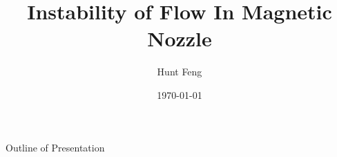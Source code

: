 \documentclass{beamer}
\title{Instability of Flow In Magnetic Nozzle}
\author{Hunt Feng}
\institute{University of Saskatchewan}
\date{\today}
\begin{document}
	\frame{\titlepage}
	\begin{frame}{Outline of Presentation}
		\tableofcontents
	\end{frame}

	
  
  
	
  
  \newpage
  \begin{frame}[allowframebreaks]
    
     
  \end{frame}
  
	
\end{document}
